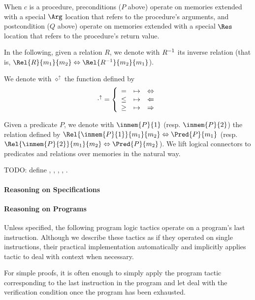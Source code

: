 When $c$ is a procedure, preconditions ($P$ above) operate on memories
extended with a special $\Arg$ location that refers to the procedure's
arguments, and postcondition ($Q$ above) operate on memories extended
with a special $\Res$ location that refers to the procedure's return
value.

In the following, given a relation $R$, we denote with $R^{-1}$
its inverse relation (that is,
$\Rel{R}{m_1}{m_2} \Leftrightarrow \Rel{\invrel{R}}{m_2}{m_1}$).

We denote with $\diamond^{\uparrow}$ the function defined by
$$
\cdot^{\uparrow} =
\left\{\begin{array}{l @{\quad\mapsto\quad} r}
=    & \Leftrightarrow \\
\leq & \Leftarrow      \\
\geq & \Rightarrow
\end{array}\right.
$$

Given a predicate $P$, we denote with $\inmem{P}{1}$
(resp. $\inmem{P}{2}$) the relation defined by
$\Rel{\inmem{P}{1}}{m_1}{m_2} \Leftrightarrow \Pred{P}{m_1}$
(resp. $\Rel{\inmem{P}{2}}{m_1}{m_2} \Leftrightarrow \Pred{P}{m_2}$).
We lift logical connectors to predicates and relations over memories
in the natural way.

TODO: define , , , ,
.

\paragraph{Reasoning on Specifications}










%

\paragraph{Reasoning on Programs}
Unless specified, the following program logic tactics operate on a
program's last instruction. Although we describe these tactics as if
they operated on single instructions, their practical implementation
automatically and implicitly applies tactic  to deal with
context when necessary.

For simple proofs, it is often enough to simply apply the program
tactic corresponding to the last instruction in the program and let
 deal with the verification condition once the program has
been exhausted.

